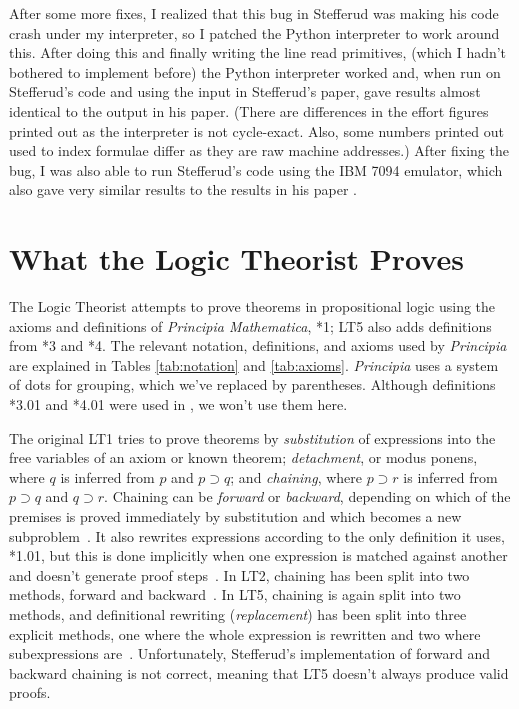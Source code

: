 \documentclass[journal]{IEEEtran}
\begin{document}
After some more fixes, I realized that
this bug in Stefferud was making his code crash under my
interpreter, so
I patched the Python interpreter to work around this.
After doing this and finally writing the line read primitives,
(which I hadn't bothered to implement before) the Python interpreter
worked and, when run on Stefferud's code and using the input in Stefferud's
paper, gave results almost identical to the output in his paper.
(There are differences in the effort figures printed out as the
interpreter is not cycle-exact. Also, some numbers printed out
used to index formulae differ as they are raw machine addresses.)
After fixing the bug, I was also able to run Stefferud's code using
the IBM 7094 emulator, which also gave very similar results to the
results in his paper \cite{moewsrepo2}.

%
% 

\section{What the Logic Theorist Proves}
\label{sec:results}

The Logic Theorist attempts to prove theorems in propositional logic
using the axioms and definitions of \textit{Principia Mathematica}, 
*1; LT5 also adds definitions from *3 and 
*4.  The relevant notation, definitions, and axioms used by \textit{Principia}
are explained in Tables \ref{tab:notation} and \ref{tab:axioms}.
{\em Principia} uses a system of dots for grouping, which we've
replaced by parentheses.
Although definitions *3.01 and *4.01 were used in \cite{stefferud1963lt},
we won't use them here.

The original LT1 tries to prove theorems by {\em substitution}
of expressions into the free variables of an axiom or known
theorem; {\em detachment}, or modus ponens, where $q$ is inferred
from $p$ and $p\supset q$; and {\em chaining}, where $p\supset r$
is inferred from $p\supset q$ and $q\supset r$.  Chaining can
be {\em forward} or {\em backward}, depending on which of the
premises is proved immediately by substitution and which becomes
a new subproblem~\cite[pp.~29--45]{LT1956b}.
It also rewrites expressions according to the only definition
it uses, *1.01, but this is done implicitly when one expression
is matched against another and doesn't generate proof 
steps~\cite[p.~34]{LT1956b}.
In LT2, chaining has been split into two methods, forward
and backward~\cite[p.~222]{LT1957}.
In LT5, chaining is again split into two methods,
and definitional rewriting ({\em replacement})
has been split into three explicit methods, one where the whole
expression is rewritten and two where subexpressions 
are~\cite[Section~III]{stefferud1963lt}.
Unfortunately, Stefferud's implementation of forward and
backward chaining is not correct, meaning that LT5 doesn't
always produce valid proofs.
\end{document}
